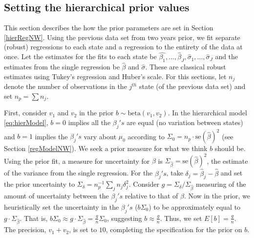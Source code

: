 \documentclass[ba]{imsart}
\begin{document}
\subsection{Setting the hierarchical prior values}
This section describes the how the prior parameters are set in  Section \ref{hierRegNW}. Using the previous data set from two years prior, we fit separate (robust) regressions to each state and a  regression to the entirety of the data at once. Let the estimates for the fits to each state be $\hat{\beta_{1}}, \dots, \hat \beta_{J}, \hat \sigma_{1}, \dots, \hat \sigma_{J}$ and the estimates from the single regression be $\hat \beta$ and $\hat \sigma$. These are classical robust estimates using Tukey's regression and Huber's scale. For this sections, let $n_{j}$ denote the number of observations in the $j^{th}$ state (of the previous data set) and set $n_{p}=\sum n_{j}$. 

First, consider $v_{1}$ and $v_{2}$ in the prior $b\sim\text{beta}(v_{1},v_{2})$.  In the hierarchical model \eqref{eq:hierModel}, $b=0$ implies all the $\beta_{j}'s$ are equal (no variation between states) and $b=1$ implies the $\beta_{j}'s$ vary about $\mu_{0}$ according to $\Sigma_{0}=n_{p}\cdot \mbox{se}(\hat\beta)^{2}$ (see Section \ref{regModelNW}). We seek a prior measure for what we think $b$ should be. Using the prior fit, a measure for  uncertainty for $\beta$ is $\Sigma_{\hat\beta}=\mbox{se}(\hat\beta)^{2}$, the estimate of the variance from the single regression. For the $\beta_{j}'s$, take $\delta_{j}=\hat\beta_{j}-\hat\beta$ and set the prior uncertainty to $\Sigma_{\delta}=n_{p}^{-1}\sum_{j} n_{j}\delta_{j}^{2}$. Consider  $g= \Sigma_{\delta}/\Sigma_{\hat\beta}$ measuring of the amount of uncertainty between the $\beta_{j}'s$ relative to that of $\beta$. Now in the prior, we heuristically set the uncertainty in the $\beta_{j}'s$ ($b\Sigma_{0}$) to be approximately equal to $g\cdot\Sigma_{\hat\beta}$. That is, $b\Sigma_{0}\approx g\cdot\Sigma_{\hat\beta}= \frac{g}{n} \Sigma_{0}$, suggesting $b\approx  \frac{g}{n}$.  Thus, we set $E[b]=\frac{g}{n}$. The precision, $v_{1}+v_{2}$, is set to $10$, completing the specification for the prior on $b$. 
\end{document}

